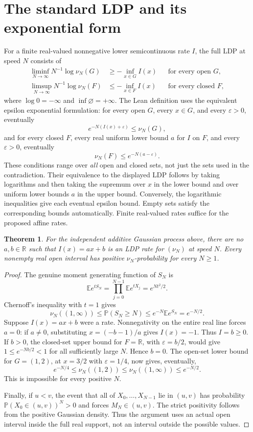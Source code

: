 \documentclass[11pt]{article}
\newtheorem{theorem}{Theorem}
\begin{document}
\section*{The standard LDP and its exponential form}
For a finite real-valued nonnegative lower semicontinuous rate $I$,
the full LDP at speed $N$ consists of
\[
 \begin{aligned}
 \liminf_{N\to\infty}N^{-1}\log\nu_N(G)&\geq-\inf_{x\in G}I(x)
                  &&\text{for every open }G,\\
 \limsup_{N\to\infty}N^{-1}\log\nu_N(F)&\leq-\inf_{x\in F}I(x)
                  &&\text{for every closed }F,
 \end{aligned}
\]
where $\log0=-\infty$ and $\inf\varnothing=+\infty$.
The Lean definition uses the equivalent epsilon exponential formulation:
for every open $G$, every $x\in G$, and every $\varepsilon>0$,
eventually
\[
 e^{-N(I(x)+\varepsilon)}\leq\nu_N(G),
\]
and for every closed $F$, every real uniform lower bound $a$ for
$I$ on $F$, and every $\varepsilon>0$, eventually
\[
 \nu_N(F)\leq e^{-N(a-\varepsilon)}.
\]
These conditions range over \emph{all} open and closed sets, not just
the sets used in the contradiction. Their equivalence to the displayed
LDP follows by taking logarithms and then taking the supremum over
$x$ in the lower bound and over uniform lower bounds $a$ in the upper
bound. Conversely, the logarithmic inequalities give each eventual
epsilon bound. Empty sets satisfy the corresponding bounds automatically.
Finite real-valued rates suffice for the proposed affine rates.

\begin{theorem}
For the independent additive Gaussian process above, there are no
$a,b\in\mathbb R$ such that $I(x)=ax+b$ is an LDP rate for $(\nu_N)$
at speed $N$. Every nonempty real open interval has positive
$\nu_N$-probability for every $N\geq1$.
\end{theorem}
\begin{proof}
The genuine moment generating function of $S_N$ is
\[
 \mathbb E e^{tS_N}
 =\prod_{j=0}^{N-1}\mathbb E e^{tX_j}
 =e^{Nt^2/2}.
\]
Chernoff's inequality with $t=1$ gives
\[
 \nu_N((1,\infty))\leq\mathbb P(S_N\geq N)
 \leq e^{-N}\mathbb E e^{S_N}=e^{-N/2}.                 \tag{1}
\]
Suppose $I(x)=ax+b$ were a rate. Nonnegativity on the entire real
line forces $a=0$: if $a\ne0$, substituting $x=(-b-1)/a$ gives
$I(x)=-1$. Thus $I=b\geq0$. If $b>0$, the closed-set upper bound
for $F=\mathbb R$, with $\varepsilon=b/2$, would give
$1\leq e^{-Nb/2}<1$ for all sufficiently large $N$. Hence $b=0$.
The open-set lower bound for $G=(1,2)$, at $x=3/2$ with
$\varepsilon=1/4$, now gives, eventually,
\[
 e^{-N/4}\leq\nu_N((1,2))\leq\nu_N((1,\infty))\leq e^{-N/2}.
\]
This is impossible for every positive $N$.

Finally, if $u<v$, the event that all of $X_0,\ldots,X_{N-1}$ lie
in $(u,v)$ has probability
$\mathbb P(X_0\in(u,v))^N>0$ and forces $M_N\in(u,v)$.
The strict positivity follows from the positive Gaussian density.
Thus the argument uses an actual open interval inside the full real
support, not an interval outside the possible values.
\end{proof}
\end{document}
